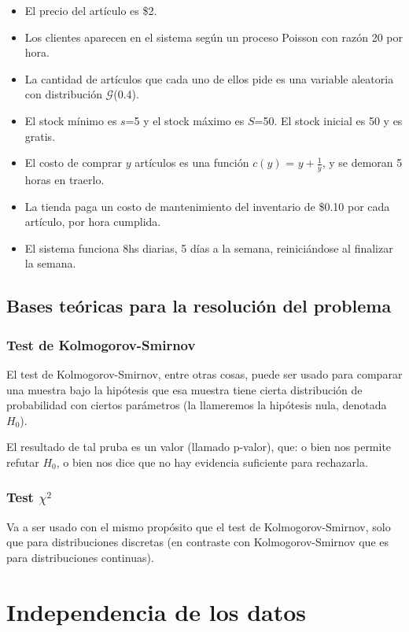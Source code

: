 \documentclass[a4paper,10pt]{article}
\begin{document}
\begin{itemize}
 \item El precio del artículo es \$2.
 \item Los clientes aparecen en el sistema según un proceso Poisson con razón 20 por hora.
 \item La cantidad de artículos que cada uno de ellos pide es una variable aleatoria con distribución $\mathcal{G}$(0.4).
 \item El stock mínimo es $s$=5 y el stock máximo es $S$=50. El stock inicial es 50 y es gratis.
 \item El costo de comprar $y$ artículos es una función $c(y)$ = $y + \frac{1}{y}$, y se demoran 5 horas en traerlo.
 \item La tienda paga un costo de mantenimiento del inventario de \$0.10 por cada artículo, por hora cumplida.
 \item El sistema funciona 8hs diarias, 5 días a la semana, reiniciándose al finalizar la semana.
\end{itemize}

\subsection*{Bases teóricas para la resolución del problema}
\vspace{0.4in}
\subsubsection*{Test de Kolmogorov-Smirnov}
El test de Kolmogorov-Smirnov, entre otras cosas, puede ser usado para comparar una muestra bajo la hipótesis que esa
muestra tiene cierta distribución de probabilidad con ciertos parámetros (la llameremos la hipótesis nula, denotada $H_0$).

El resultado de tal pruba es un valor (llamado p-valor), que: o bien nos permite refutar $H_0$, o bien nos dice que
no hay evidencia suficiente para rechazarla.


\subsubsection*{Test $\chi^2$}
Va a ser usado con el mismo propósito que el test de Kolmogorov-Smirnov, solo que para distribuciones discretas (en contraste
con Kolmogorov-Smirnov que es para distribuciones continuas).

\pagebreak

\section*{Independencia de los datos}
\end{document}
